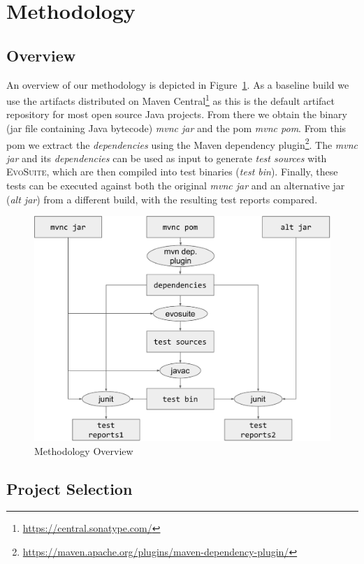 \documentclass[conference]{IEEEtran}
\makeatletter
\newcommand{\evosuite}{\textsc{EvoSuite}\@\xspace}
\makeatother
\begin{document}
\section{Methodology}
\label{sec:methodology}


\subsection{Overview}

An overview of our methodology is depicted in Figure~\ref{fig:methodology}.  As a baseline build we use the artifacts distributed on Maven Central\footnote{\url{https://central.sonatype.com/}} as this is the default artifact repository for most open source Java projects.  From there we obtain the binary (jar file containing Java bytecode) \textit{mvnc jar} and the pom \textit{mvnc pom}. From this pom we extract the \textit{dependencies} using the Maven dependency plugin\footnote{\url{https://maven.apache.org/plugins/maven-dependency-plugin/}}. The \textit{mvnc jar} and its \textit{dependencies} can be used as input to generate \textit{test sources} with \evosuite, which are then compiled into test binaries (\textit{test bin}). Finally, these tests can be executed against both the original \textit{mvnc jar} and an alternative jar (\textit{alt jar}) from a different build, with the resulting test reports compared.

\begin{figure}[t!]
	\centering
	\includegraphics[width=0.8\columnwidth]{figures/methodology.pdf}
	\caption{Methodology Overview \label{fig:methodology}}
\end{figure}


\subsection{Project Selection}
\end{document}
